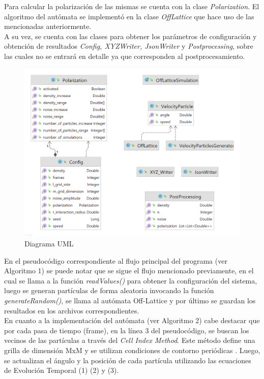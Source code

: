 \documentclass[12pt, a4paper]{report}
\begin{document}
Para calcular la polarización de las mismas se cuenta con la clase \emph{Polarization}. El algoritmo del autómata se implementó en la clase \emph{OffLattice} que hace uso de las mencionadas anteriormente.\\  

A su vez, se cuenta con las clases para obtener los parámetros de configuración y obtención de resultados \emph{Config, XYZWriter, JsonWriter} y \emph{Postprocessing}, sobre las cuales no se entrará en detalle ya que corresponden al postprocesamiento.

\pagebreak

\begin{figure}[h]
\includegraphics[scale=0.3]{UML.png}
\centering 
\caption{Diagrama UML}
\label{fig:uml}
\end{figure}

En el pseudocódigo correspondiente al flujo principal del programa (ver Algoritmo 1) se puede notar que se sigue el flujo mencionado previamente, en el cual se llama a la función \emph{readValues()} para obtener la configuración del sistema, luego se generan partículas de forma aleatoria invocando la función \emph{generateRandom()}, se llama al autómata Off-Lattice y por último se guardan los resultados en los archivos correspondientes.\\

En cuanto a la implementación del autómata (ver Algoritmo 2) cabe destacar que por cada pasa de tiempo (frame), en la línea 3 del pseudocódigo, se buscan los vecinos de las partículas a través del \emph{Cell Index Method}. Este método define una grilla de dimensión MxM y se utilizan condiciones de contorno periódicas \cite{cellIndex}.
Luego, se actualizan el ángulo y la posición de cada partícula utilizando las ecuaciones de Evolución Temporal (1) (2) y (3). 
\end{document}
